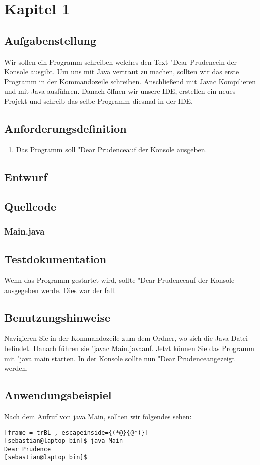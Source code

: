 \section{Kapitel 1}
\subsection{Aufgabenstellung}
Wir sollen ein Programm schreiben welches den Text "Dear Prudence\dq \space in der Konsole ausgibt. 
Um uns mit Java vertraut zu machen, sollten wir das erste Programm in der Kommandozeile schreiben.
Anschlie\ss end mit Javac Kompilieren und mit Java ausführen. Danach öffnen wir unsere IDE, erstellen
ein neues Projekt und schreib das selbe Programm diesmal in der IDE.

\subsection{Anforderungsdefinition}
\begin{enumerate}
	\item Das Programm soll "Dear Prudence\dq \space auf der Konsole ausgeben.
\end{enumerate}

\subsection{Entwurf}


\subsection{Quellcode}
\subsubsection{Main.java}


\subsection{Testdokumentation}
Wenn das Programm gestartet wird, sollte "Dear Prudence\dq \space auf der Konsole ausgegeben werde.
Dies war der fall.

\subsection{Benutzungshinweise}
Navigieren Sie in der Kommandozeile zum dem Ordner, wo sich die Java Datei befindet.
Danach führen sie "javac Main.java\dq \space auf. Jetzt können Sie das Programm mit "java main\dq \space
 starten. In der Konsole sollte nun "Dear Prudence\dq \space angezeigt werden.

\subsection{Anwendungsbeispiel}
Nach dem Aufruf von java Main, sollten wir folgendes sehen:
\begin{lstlisting}[frame = trBL , escapeinside={(*@}{@*)}]
[sebastian@laptop bin]$ java Main 
Dear Prudence
[sebastian@laptop bin]$ 
\end{lstlisting}